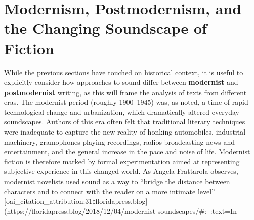 \documentclass[12pt]{report}
\begin{document}
\section{Modernism, Postmodernism, and the Changing Soundscape of Fiction}
While the previous sections have touched on historical context, it is useful to explicitly consider how approaches to sound differ between \textbf{modernist} and \textbf{postmodernist} writing, as this will frame the analysis of texts from different eras. The modernist period (roughly 1900–1945) was, as noted, a time of rapid technological change and urbanization, which dramatically altered everyday soundscapes. Authors of this era often felt that traditional literary techniques were inadequate to capture the new reality of honking automobiles, industrial machinery, gramophones playing recordings, radios broadcasting news and entertainment, and the general increase in the pace and noise of life. Modernist fiction is therefore marked by formal experimentation aimed at representing subjective experience in this changed world. As Angela Frattarola observes, modernist novelists used sound as a way to “bridge the distance between characters and to connect with the reader on a more intimate level” [oai_citation_attribution:31‡floridapress.blog](https://floridapress.blog/2018/12/04/modernist-soundscapes/#:~:text=In%
\end{document}
